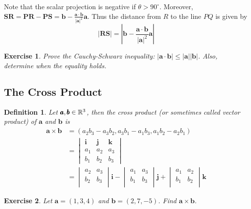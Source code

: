 \documentclass[12pt]{article}
\newtheorem{defn}{Definition}[section]
\newtheorem{exercise}{Exercise}[section]
\begin{document}
Note that the scalar projection is negative if $\theta > 90^\circ$. Moreover, 
$\pmb{SR}=\pmb{PR}-\pmb{PS}=\pmb{b} - \frac{ \pmb{a} \cdot \pmb{b} }{|\pmb{a}|^2}\pmb{a}$.
Thus the distance from $R$ to the line $PQ$ is given by
$$ |\pmb{RS}| = \left| \pmb{b} - \frac{ \pmb{a} \cdot \pmb{b} }{|\pmb{a}|^2}\pmb{a} \right| $$ 

\begin{exercise}
  Prove the Cauchy-Schwarz inequality: $|\pmb{a} \cdot \pmb{b}| \leq |\pmb{a}| |\pmb{b}|$. Also, determine when the equality holds.
\end{exercise}

\subsection{The Cross Product}
\begin{defn}
  Let $\pmb{a}, \pmb{b} \in \mathbb{R}^3$, then the cross product (or sometimes called vector product)
  of $\pmb{a}$ and $\pmb{b}$ is 
  \begin{align*}
    \pmb{a} \times \pmb{b} &= (a_2b_3 - a_3b_2, a_3b_1 - a_1b_3, a_1b_2 - a_2b_1) \\
        &=  
        \begin{vmatrix}
          \pmb{i} & \pmb{j} & \pmb{k} \\
          a_1 & a_2 & a_3 \\
          b_1 & b_2 & b_3
        \end{vmatrix} \\
        &= 
        \begin{vmatrix}
          a_2 & a_3 \\
          b_2 & b_3 \\
        \end{vmatrix} \pmb{i}
        - \begin{vmatrix}
          a_1 & a_3 \\
          b_1 & b_3 \\
        \end{vmatrix} \pmb{j}
        + \begin{vmatrix}
          a_1 & a_2 \\
          b_1 & b_2 \\
        \end{vmatrix} \pmb{k}
  \end{align*}
\end{defn}

\begin{exercise}
  Let $\pmb{a} = (1,3,4)$ and $\pmb{b} = (2,7,-5)$. Find $\pmb{a} \times \pmb{b}$.
\end{exercise}
\end{document}
